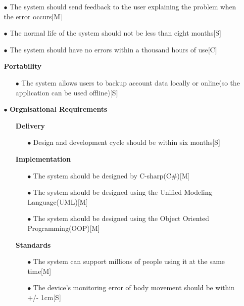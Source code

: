 \documentclass[a4paper]{article}
\begin{document}
\begin{itemize}
\begin{itemize}
\begin{itemize}
				\item[$\bullet$] The system should send feedback to the user explaining the problem when the error occurs\hfill[M]
				\item[$\bullet$] The normal life of the system should not be less than eight months\hfill[S]
				\item[$\bullet$] The system should have no errors within a thousand hours of use\hfill[C]
			\end{itemize}
		\end{itemize}
		\begin{itemize}
			\item[] \textbf{Portability}
			\begin{itemize}
				\item[$\bullet$] The system allows users to backup account data locally or online(so the application can be used offline)\hfill[S]
			\end{itemize}
		\end{itemize}
	\end{itemize}

	\begin{itemize}
		\item[$\bullet$] {\large\textbf{Orgnisational Requirements}}
		\begin{itemize}
			\item[] \textbf{Delivery}
			\begin{itemize}
				\item[$\bullet$] Design and development cycle should be within six months\hfill[S]
			\end{itemize}
		\end{itemize}
		\begin{itemize}
			\item[] \textbf{Implementation}
			\begin{itemize}
				\item[$\bullet$] The system should be designed by C-sharp(C\#)\hfill[M]
				\item[$\bullet$] The system should be designed using the Unified Modeling Language(UML)\hfill[M]
				\item[$\bullet$] The system should be designed using the Object Oriented Programming(OOP)\hfill[M]		
			\end{itemize}
		\end{itemize}
		\begin{itemize}
			\item[] \textbf{Standards}
			\begin{itemize}
				\item[$\bullet$] The system can support millions of people using it at the same time\hfill[M]
				\item[$\bullet$] The device's monitoring error of body movement should be within +/- 1cm\hfill[S]
			\end{itemize}
		\end{itemize}
	\end{itemize}
\end{document}
